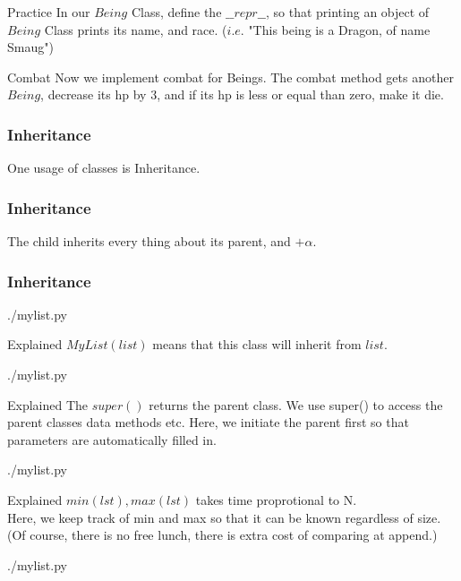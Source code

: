 \documentclass{beamer}
\begin{document}
\begin{frame}{Practice}
  In our $Being$ Class, define the $\_\_repr\_\_$, so that printing an object
  of $Being$ Class prints its name, and race.
  ($i.e.$ "This being is a Dragon, of name Smaug")
\end{frame}

\begin{frame}{Combat}
  Now we implement combat for Beings.
  The combat method gets another $Being$, decrease its hp by $3$, and if its hp
  is less or equal than zero, make it die.
\end{frame}

\begin{frame}
\frametitle{Inheritance}
One usage of classes is Inheritance.
\end{frame}

\begin{frame}
\frametitle{Inheritance}
The child inherits every thing about its parent, and $+\alpha$.
\end{frame}

\begin{frame}[fragile]
\frametitle{Inheritance}
\begin{lstinputlisting}
  {./mylist.py}
\end{lstinputlisting}
\end{frame}

\begin{frame}{Explained}
  $MyList(list)$ means that this class will inherit from $list$.
  \begin{lstinputlisting}[firstline=1, lastline=1]
  {./mylist.py}
\end{lstinputlisting}
\end{frame}

\begin{frame}{Explained}
  The $super()$ returns the parent class. We use super() to access the parent
  classes data methods etc. Here, we initiate the parent first so that
  parameters are automatically filled in.
  \begin{lstinputlisting}[firstline=1, lastline=4]
  {./mylist.py}
\end{lstinputlisting}
\end{frame}

\begin{frame}{Explained}
  $min(lst), max(lst)$ takes time proprotional to N.\\
  Here, we keep track of min and max so that it can be known regardless of
  size.\\
  (Of course, there is no free lunch, there is extra cost of comparing at append.)
  \begin{lstinputlisting}[firstline=1, lastline=6]
  {./mylist.py}
  \end{lstinputlisting}
\end{frame}
\end{document}
